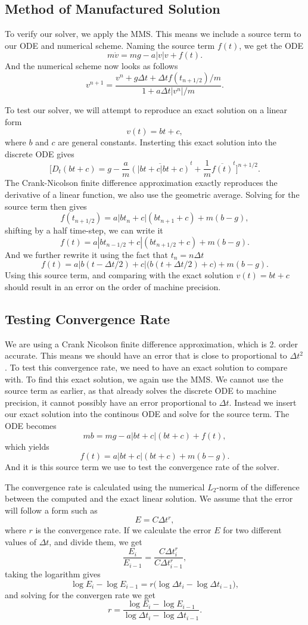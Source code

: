 \documentclass[a4paper, 11pt, notitlepage, english]{article}
\begin{document}
\subsection*{Method of Manufactured Solution}
To verify our solver, we apply the MMS. This means we include a source term to our ODE and numerical scheme. Naming the source term $f(t)$, we get the ODE
$$m\dot{v} = mg - a |v| v + f(t).$$
And the numerical scheme now looks as follows
$$v^{n+1} = \frac{v^n + g \Delta t + \Delta t f(t_{n+1/2})/m}{1 + a  \Delta t |v^n|/m}.$$

To test our solver, we will attempt to reproduce an exact solution on a linear form
$$v(t) = bt + c,$$
where $b$ and $c$ are general constants. Insterting this exact solution into the discrete ODE gives
$$\big[D_t (bt+c) = g - \frac{a}{m} \overline{(|bt+c|bt+c)}^t + \frac{1}{m}\overline{f(t)}^t\big]^{n+1/2}.$$
The Crank-Nicolson finite difference approximation exactly reproduces the derivative of a linear function, we also use the geometric average. Solving for the source term then gives
$$f(t_{n+1/2}) = a|bt_n + c|(b t_{n+1} + c) + m(b-g),$$
shifting by a half time-step, we can write it
$$f(t) = a|bt_{n-1/2} + c|(bt_{n+1/2} + c) + m(b-g).$$
And we further rewrite it using the fact that $t_n = n\Delta t$
$$f(t) = a\big|b(t-\Delta t/2) + c\big|\big(b(t+ \Delta t/2) + c\big) + m(b-g).$$
Using this source term, and comparing with the exact solution $v(t) = bt+c$ should result in an error on the order of machine precision.


\subsection*{Testing Convergence Rate}
We are using a Crank Nicolson finite difference approximation, which is 2. order accurate. This means we should have an error that is close to proportional to $\Delta t^2$. To test this convergence rate, we need to have an exact solution to compare with. To find this exact solution, we again use the MMS. We cannot use the source term as earlier, as that already solves the discrete ODE to machine precision, it cannot possibly have an error proportional to $\Delta t$. Instead we insert our exact solution into the continous ODE and solve for the source term. The ODE becomes
$$mb = mg - a|bt+c|(bt+c) + f(t),$$
which yields
$$f(t) = a|bt+c| (bt+c) + m(b-g).$$
And it is this source term we use to test the convergence rate of the solver.

The convergence rate is calculated using the numerical $L_2$-norm of the difference between the computed and the exact linear solution. 
We assume that the error will follow a form such as
$$E = C\Delta t ^r,$$
where $r$ is the convergence rate. If we calculate the error $E$ for two different values of $\Delta t$, and divide them, we get
$$\frac{E_i}{E_{i-1}} = \frac{C \Delta t_i^r}{C \Delta t_{i-1}^r},$$
taking the logarithm gives
$$\log E_i - \log E_{i-1} = r \big( \log \Delta t_i - \log \Delta t_{i-1}\big),$$
and solving for the convergen rate we get
$$r = \frac{\log E_i - \log E_{i-1}}{\log \Delta t_i - \log \Delta t_{i-1}}.$$
\end{document}

